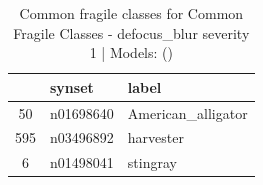 \begin{table}
\caption{Common fragile classes for Common Fragile Classes - defocus_blur severity 1 | Models: ()}
\label{tab:Common Fragile Classes - defocus_blur severity 1_d41d8cd9}
\begin{tabular}{cll}
\toprule
 & synset & label \\
\midrule
50 & n01698640 & American_alligator \\
595 & n03496892 & harvester \\
6 & n01498041 & stingray \\
\bottomrule
\end{tabular}
\end{table}
